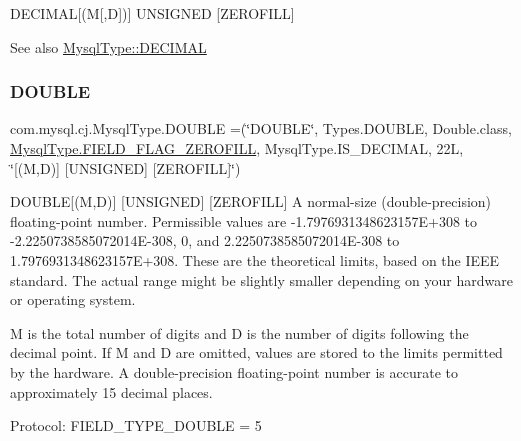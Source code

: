 D\+E\+C\+I\+M\+AL\mbox{[}(M\mbox{[},D\mbox{]})\mbox{]} U\+N\+S\+I\+G\+N\+ED \mbox{[}Z\+E\+R\+O\+F\+I\+LL\mbox{]}

\begin{DoxySeeAlso}{See also}
\mbox{\hyperlink{enumcom_1_1mysql_1_1cj_1_1_mysql_type_a90f5401b1fa7f31d2d384156fa552e2c}{Mysql\+Type\+::\+D\+E\+C\+I\+M\+AL}} 
\end{DoxySeeAlso}
\mbox{\label{enumcom_1_1mysql_1_1cj_1_1_mysql_type_a3f95bc5758ff4e4f6ce9cd1fb1889400}} 
\subsubsection{\texorpdfstring{D\+O\+U\+B\+LE}{DOUBLE}}
{\footnotesize\ttfamily com.\+mysql.\+cj.\+Mysql\+Type.\+D\+O\+U\+B\+LE =(\char`\"{}D\+O\+U\+B\+LE\char`\"{}, Types.\+D\+O\+U\+B\+LE, Double.\+class, \mbox{\hyperlink{enumcom_1_1mysql_1_1cj_1_1_mysql_type_abb76a1f2f3dac9a30d1b559b8ba66a48}{Mysql\+Type.\+F\+I\+E\+L\+D\+\_\+\+F\+L\+A\+G\+\_\+\+Z\+E\+R\+O\+F\+I\+LL}}, Mysql\+Type.\+I\+S\+\_\+\+D\+E\+C\+I\+M\+AL, 22\+L, \char`\"{}\mbox{[}(\+M,\+D)\mbox{]} \mbox{[}\+U\+N\+S\+I\+G\+N\+E\+D\mbox{]} \mbox{[}\+Z\+E\+R\+O\+F\+I\+L\+L\mbox{]}\char`\"{})}

D\+O\+U\+B\+LE\mbox{[}(M,D)\mbox{]} \mbox{[}U\+N\+S\+I\+G\+N\+ED\mbox{]} \mbox{[}Z\+E\+R\+O\+F\+I\+LL\mbox{]} A normal-\/size (double-\/precision) floating-\/point number. Permissible values are -\/1.\+7976931348623157E+308 to -\/2.\+2250738585072014E-\/308, 0, and 2.\+2250738585072014E-\/308 to 1.\+7976931348623157E+308. These are the theoretical limits, based on the I\+E\+EE standard. The actual range might be slightly smaller depending on your hardware or operating system.

M is the total number of digits and D is the number of digits following the decimal point. If M and D are omitted, values are stored to the limits permitted by the hardware. A double-\/precision floating-\/point number is accurate to approximately 15 decimal places.

Protocol\+: F\+I\+E\+L\+D\+\_\+\+T\+Y\+P\+E\+\_\+\+D\+O\+U\+B\+LE = 5

